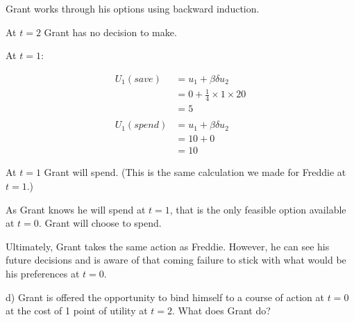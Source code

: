 \documentclass[
  letterpaper,
  DIV=11,
  numbers=noendperiod]{scrreprt}
\begin{document}
\begin{tcolorbox}[enhanced jigsaw, title=\textcolor{quarto-callout-tip-color}{\faLightbulb}\hspace{0.5em}{Answer}, toprule=.15mm, colback=white, breakable, titlerule=0mm, colframe=quarto-callout-tip-color-frame, coltitle=black, opacityback=0, rightrule=.15mm, colbacktitle=quarto-callout-tip-color!10!white, bottomtitle=1mm, opacitybacktitle=0.6, arc=.35mm, bottomrule=.15mm, toptitle=1mm, leftrule=.75mm, left=2mm]

Grant works through his options using backward induction.

At \(t=2\) Grant has no decision to make.

At \(t=1\):

\begin{align*}
U_1(save)&=u_1+\beta\delta u_2 \\
&=0+\frac{1}{4}\times 1\times 20 \\
&=5 \\
\\
U_1(spend)&=u_1+\beta\delta u_2 \\
&=10+0\\
&=10
\end{align*}

At \(t=1\) Grant will spend. (This is the same calculation we made for
Freddie at \(t=1\).)

As Grant knows he will spend at \(t=1\), that is the only feasible
option available at \(t=0\). Grant will choose to spend.

Ultimately, Grant takes the same action as Freddie. However, he can see
his future decisions and is aware of that coming failure to stick with
what would be his preferences at \(t=0\).

\end{tcolorbox}

d) Grant is offered the opportunity to bind himself to a course of
action at \(t=0\) at the cost of 1 point of utility at \(t=2\). What
does Grant do?
\end{document}
